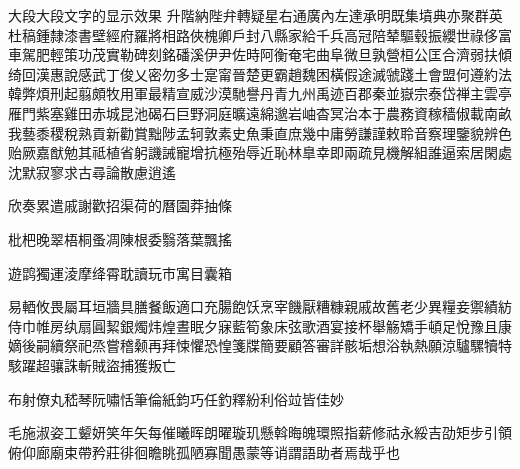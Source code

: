 \documentclass[xcolor=table,mathserif]{beamer}
\begin{document}
\begin{frame}[allowframebreaks]{大段大段文字的显示效果}
升階納陛\enspace 弁轉疑星\enspace 右通廣內\enspace 左達承明\enspace 既集墳典\enspace 亦聚群英\enspace 杜稿鍾隸\enspace 漆書壁經\enspace 府羅將相\enspace 路俠槐卿\enspace 戶封八縣\enspace 家給千兵\enspace 高冠陪辇\enspace 驅毂振纓\enspace 世祿侈富\enspace 車駕肥輕\enspace 策功茂實\enspace 勒碑刻銘\enspace 磻溪伊尹\enspace 佐時阿衡\enspace 奄宅曲阜\enspace 微旦孰營\enspace 桓公匡合\enspace 濟弱扶傾\enspace 绮回漢惠\enspace 說感武丁\enspace 俊乂密勿\enspace 多士寔甯\enspace 晉楚更霸\enspace 趙魏困橫\enspace 假途滅虢\enspace 踐土會盟\enspace 何遵約法\enspace 韓弊煩刑\enspace 起翦頗牧\enspace 用軍最精\enspace 宣威沙漠\enspace 馳譽丹青\enspace 九州禹迹\enspace 百郡秦並\enspace 嶽宗泰岱\enspace 禅主雲亭\enspace 雁門紫塞\enspace 雞田赤城\enspace 昆池碣石\enspace 巨野洞庭\enspace 曠遠綿邈\enspace 岩岫杳冥\enspace 治本于農\enspace 務資稼穑\enspace 俶載南畝\enspace 我藝黍稷\enspace 稅熟貢新\enspace 勸賞黜陟\enspace 孟轲敦素\enspace 史魚秉直\enspace 庶幾中庸\enspace 勞謙謹敕\enspace 聆音察理\enspace 鑒貌辨色\enspace 贻厥嘉猷\enspace 勉其祗植\enspace 省躬譏誡\enspace 寵增抗極\enspace 殆辱近恥\enspace 林臯幸即\enspace 兩疏見機\enspace 解組誰逼\enspace 索居閑處\enspace 沈默寂寥\enspace 求古尋論\enspace 散慮逍遙\enspace 

欣奏累遣\enspace 戚謝歡招\enspace 渠荷的曆\enspace 園莽抽條\enspace 

枇杷晚翠\enspace 梧桐蚤凋\enspace 陳根委翳\enspace 落葉飄搖\enspace 

遊鹍獨運\enspace 淩摩绛霄\enspace 耽讀玩市\enspace 寓目囊箱\enspace 

易輏攸畏\enspace 屬耳垣牆\enspace 具膳餐飯\enspace 適口充腸\enspace 飽饫烹宰\enspace 饑厭糟糠\enspace\enspace 親戚故舊\enspace 老少異糧\enspace 妾禦績紡\enspace 侍巾帷房\enspace 纨扇圓絜\enspace 銀燭炜煌\enspace\enspace 晝眠夕寐\enspace 藍筍象床\enspace 弦歌酒宴\enspace 接杯舉觞\enspace 矯手頓足\enspace 悅豫且康\enspace\enspace 嫡後嗣續\enspace 祭祀烝嘗\enspace 稽颡再拜\enspace 悚懼恐惶\enspace 箋牒簡要\enspace 顧答審詳\enspace\enspace 骸垢想浴\enspace 執熱願涼\enspace 驢騾犢特\enspace 駭躍超骧\enspace 誅斬賊盜\enspace 捕獲叛亡

布射僚丸\enspace 嵇琴阮嘯\enspace 恬筆倫紙\enspace 鈞巧任釣\enspace 釋紛利俗\enspace 竝皆佳妙

毛施淑姿\enspace 工颦妍笑\enspace 年矢每催\enspace 曦晖朗曜\enspace 璇玑懸斡\enspace 晦魄環照\enspace 指薪修祜\enspace 永綏吉劭\enspace 矩步引領\enspace 俯仰廊廟\enspace 束帶矜莊\enspace 徘徊瞻眺\enspace 孤陋寡聞\enspace 愚蒙等诮\enspace 謂語助者\enspace 焉哉乎也


\end{frame}
\end{document}
